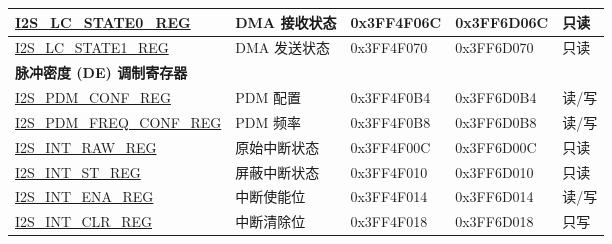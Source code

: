\begin{longtable}{ | p{5.8cm} | p{4.5cm} | p{1.9cm} | p{1.9cm} | p{0.8cm} | }
\hyperref[regdesc:I2SLCSTATE0REG]{I2S\_LC\_STATE0\_REG} & DMA 接收状态 & 0x3FF4F06C & 0x3FF6D06C & 只读 \\ \hline
\hyperref[regdesc:I2SLCSTATE1REG]{I2S\_LC\_STATE1\_REG} & DMA 发送状态 & 0x3FF4F070 & 0x3FF6D070 & 只读 \\ \hline
\multicolumn{5}{|l|}{\textbf{脉冲密度 (DE) 调制寄存器}} \\ \hline
\hyperref[regdesc:I2SPDMCONFREG]{I2S\_PDM\_CONF\_REG} & PDM 配置 & 0x3FF4F0B4 & 0x3FF6D0B4 & 读/写 \\ \hline
\hyperref[regdesc:I2SPDMFREQCONFREG]{I2S\_PDM\_FREQ\_CONF\_REG} & PDM 频率 & 0x3FF4F0B8 & 0x3FF6D0B8 & 读/写 \\ \hline
\hyperref[regdesc:I2SINTRAWREG]{I2S\_INT\_RAW\_REG} & 原始中断状态 & 0x3FF4F00C & 0x3FF6D00C & 只读 \\ \hline
\hyperref[regdesc:I2SINTSTREG]{I2S\_INT\_ST\_REG} & 屏蔽中断状态 & 0x3FF4F010 & 0x3FF6D010 & 只读 \\ \hline
\hyperref[regdesc:I2SINTENAREG]{I2S\_INT\_ENA\_REG} & 中断使能位 & 0x3FF4F014 & 0x3FF6D014 & 读/写 \\ \hline
\hyperref[regdesc:I2SINTCLRREG]{I2S\_INT\_CLR\_REG} & 中断清除位 & 0x3FF4F018 & 0x3FF6D018 & 只写 \\ \hline
\end{longtable}
